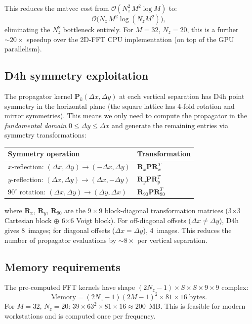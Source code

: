 \documentclass[11pt,a4paper]{article}
\newcommand{\D}{\Delta}
\newcommand{\order}{\mathcal{O}}
\newcommand{\bP}{\bm{P}}
\begin{document}
This reduces the matvec cost from $\order(N_z^2\,M^2 \log M)$ to:
\begin{equation}
  \order\bigl(N_z\,M^2 \log(N_z M^2)\bigr),
\end{equation}
eliminating the $N_z^2$ bottleneck entirely.  For $M = 32$,
$N_z = 20$, this is a further $\sim\!20\times$ speedup over the
2D-FFT CPU implementation (on top of the GPU parallelism).

\subsection{D4h symmetry exploitation}
\label{sec:d4h}

The propagator kernel $\bP_{k}(\D x, \D y)$ at each vertical
separation has D4h point symmetry in the horizontal plane
(the square lattice has 4-fold rotation and mirror symmetries).
This means we only need to compute the propagator in the
\emph{fundamental domain} $0 \leq \D y \leq \D x$ and generate
the remaining entries via symmetry transformations:

\begin{center}
\renewcommand{\arraystretch}{1.3}
\begin{tabular}{ll}
\toprule
\textbf{Symmetry operation} & \textbf{Transformation} \\
\midrule
$x$-reflection: $(\D x, \D y) \to (-\D x, \D y)$ &
  $\bm{R}_x \bP \bm{R}_x^T$ \\
$y$-reflection: $(\D x, \D y) \to (\D x, -\D y)$ &
  $\bm{R}_y \bP \bm{R}_y^T$ \\
$90^\circ$ rotation: $(\D x, \D y) \to (\D y, \D x)$ &
  $\bm{R}_{90} \bP \bm{R}_{90}^T$ \\
\bottomrule
\end{tabular}
\end{center}

where $\bm{R}_x$, $\bm{R}_y$, $\bm{R}_{90}$ are the $9 \times 9$
block-diagonal transformation matrices (3$\times$3 Cartesian block
$\oplus$ 6$\times$6 Voigt block).  For off-diagonal offsets
($\D x \neq \D y$), D4h gives 8~images; for diagonal offsets
($\D x = \D y$), 4~images.  This reduces the number of propagator
evaluations by $\sim\!8\times$ per vertical separation.

\subsection{Memory requirements}

The pre-computed FFT kernels have shape
$(2N_z{-}1) \times S \times S \times 9 \times 9$ complex:
\begin{equation}
  \text{Memory} = (2N_z - 1)(2M - 1)^2 \times 81 \times 16\;\text{bytes}.
\end{equation}
For $M = 32$, $N_z = 20$: $39 \times 63^2 \times 81 \times 16
\approx 200$~MB.  This is feasible for modern workstations and
is computed once per frequency.
\end{document}

